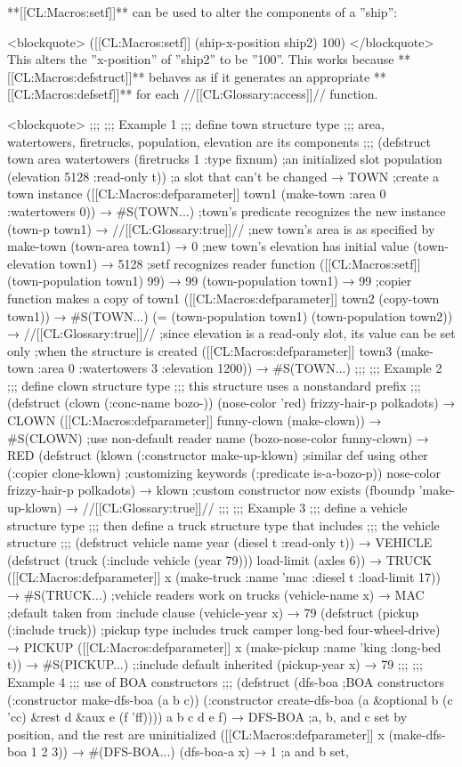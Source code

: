 **[[CL:Macros:setf]]** can be used to alter the components of a ''ship'':

<blockquote> ([[CL:Macros:setf]] (ship-x-position ship2) 100) </blockquote> This alters the ''x-position'' of ''ship2'' to be ''100''. This works because **[[CL:Macros:defstruct]]** behaves as if it generates an appropriate **[[CL:Macros:defsetf]]** for each //[[CL:Glossary:access]]// function.

<blockquote> ;;; ;;; Example 1 ;;; define town structure type ;;; area, watertowers, firetrucks, population, elevation are its components ;;; (defstruct town area watertowers (firetrucks 1 :type fixnum) ;an initialized slot population (elevation 5128 :read-only t)) ;a slot that can't be changed → TOWN ;create a town instance ([[CL:Macros:defparameter]] town1 (make-town :area 0 :watertowers 0)) → #S(TOWN...) ;town's predicate recognizes the new instance (town-p town1) → //[[CL:Glossary:true]]// ;new town's area is as specified by make-town (town-area town1) → 0 ;new town's elevation has initial value (town-elevation town1) → 5128 ;setf recognizes reader function ([[CL:Macros:setf]] (town-population town1) 99) → 99 (town-population town1) → 99 ;copier function makes a copy of town1 ([[CL:Macros:defparameter]] town2 (copy-town town1)) → #S(TOWN...) (= (town-population town1) (town-population town2)) → //[[CL:Glossary:true]]// ;since elevation is a read-only slot, its value can be set only ;when the structure is created ([[CL:Macros:defparameter]] town3 (make-town :area 0 :watertowers 3 :elevation 1200)) → #S(TOWN...) ;;; ;;; Example 2 ;;; define clown structure type ;;; this structure uses a nonstandard prefix ;;; (defstruct (clown (:conc-name bozo-)) (nose-color 'red) frizzy-hair-p polkadots) → CLOWN ([[CL:Macros:defparameter]] funny-clown (make-clown)) → #S(CLOWN) ;use non-default reader name (bozo-nose-color funny-clown) → RED (defstruct (klown (:constructor make-up-klown) ;similar def using other (:copier clone-klown) ;customizing keywords (:predicate is-a-bozo-p)) nose-color frizzy-hair-p polkadots) → klown ;custom constructor now exists (fboundp 'make-up-klown) → //[[CL:Glossary:true]]// ;;; ;;; Example 3 ;;; define a vehicle structure type ;;; then define a truck structure type that includes ;;; the vehicle structure ;;; (defstruct vehicle name year (diesel t :read-only t)) → VEHICLE (defstruct (truck (:include vehicle (year 79))) load-limit (axles 6)) → TRUCK ([[CL:Macros:defparameter]] x (make-truck :name 'mac :diesel t :load-limit 17)) → #S(TRUCK...) ;vehicle readers work on trucks (vehicle-name x) → MAC ;default taken from :include clause (vehicle-year x) → 79 (defstruct (pickup (:include truck)) ;pickup type includes truck camper long-bed four-wheel-drive) → PICKUP ([[CL:Macros:defparameter]] x (make-pickup :name 'king :long-bed t)) → #S(PICKUP...) ;:include default inherited (pickup-year x) → 79 ;;; ;;; Example 4 ;;; use of BOA constructors ;;; (defstruct (dfs-boa ;BOA constructors (:constructor make-dfs-boa (a b c)) (:constructor create-dfs-boa (a &optional b (c 'cc) &rest d &aux e (f 'ff)))) a b c d e f) → DFS-BOA ;a, b, and c set by position, and the rest are uninitialized ([[CL:Macros:defparameter]] x (make-dfs-boa 1 2 3)) → #(DFS-BOA...) (dfs-boa-a x) → 1 ;a and b set, 